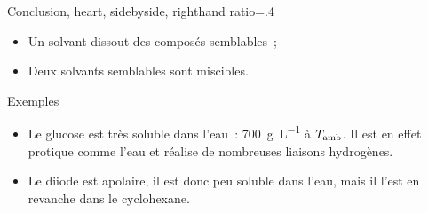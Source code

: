 \documentclass[../main/main.tex]{subfiles}
\begin{document}
\begin{tror}{Conclusion, heart, sidebyside, righthand ratio=.4}
    \begin{itemize}
        \item Un solvant dissout des composés semblables~;
        \item Deux solvants semblables sont miscibles.
    \end{itemize}
    \tcblower
    \begin{center}
        \begin{bfseries}
        \end{bfseries}
    \end{center}
\end{tror}

\begin{rexem}{Exemples}
    \begin{itemize}
        \item Le glucose est très soluble dans l'eau~: \SI{700}{g.L^{-1}} à
            $T_{\rm amb}$. Il est en effet protique comme l'eau et réalise de
            nombreuses liaisons hydrogènes.
        \item Le diiode est apolaire, il est donc peu soluble dans l'eau, mais
            il l'est en revanche dans le cyclohexane.
    \end{itemize}
\end{rexem}
\end{document}
